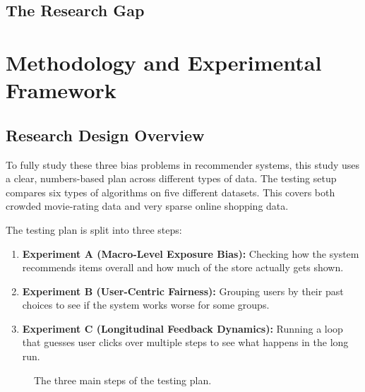 \documentclass[11pt,a4paper]{report}
\begin{document}
\section{The Research Gap}

\chapter{Methodology and Experimental Framework}
\label{ch:methodology}

\section{Research Design Overview}
To fully study these three bias problems in recommender systems, this study uses a clear, numbers-based plan across different types of data. The testing setup compares six types of algorithms on five different datasets. This covers both crowded movie-rating data and very sparse online shopping data.

The testing plan is split into three steps:
\begin{enumerate}
    \item \textbf{Experiment A (Macro-Level Exposure Bias):} Checking how the system recommends items overall and how much of the store actually gets shown.
    \item \textbf{Experiment B (User-Centric Fairness):} Grouping users by their past choices to see if the system works worse for some groups.
    \item \textbf{Experiment C (Longitudinal Feedback Dynamics):} Running a loop that guesses user clicks over multiple steps to see what happens in the long run.
\end{enumerate}

\begin{figure}[htbp]
  \centering
  \caption{The three main steps of the testing plan.}
  \label{fig:pipeline}
\end{figure}
\end{document}
